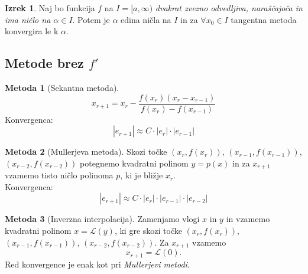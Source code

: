 \documentclass[11pt]{article}
\theoremstyle{definition}
\newtheorem{izrek}{Izrek}
\newtheorem*{metoda}{Metoda}
\begin{document}
\begin{izrek}

Naj bo funkcija $f$ na $I = [a, \infty)$ \textit{dvakrat zvezno odvedljiva, naraščajoča in ima ničlo na $\alpha \in I$}. Potem je $\alpha$ edina ničla na $I$ in za $\forall x_0 \in I$ tangentna metoda konvergira le k $\alpha$.

\end{izrek}
\vspace{0.5cm}


\subsection{Metode brez $f'$}
\vspace{0.5cm}


\begin{metoda}[Sekantna metoda]

$$x_{r+1} = x_r - \frac{f(x_r)(x_r - x_{r-1})}{f(x_r) - f(x_{r-1})}$$
Konvergenca:
$$|e_{r+1}| \approx C \cdot |e_r| \cdot |e_{r-1}|$$

\end{metoda}
\vspace{0.5cm}

\begin{metoda}[Mullerjeva metoda]

Skozi točke $(x_r, f(x_r))$, $(x_{r-1}, f(x_{r-1}))$, \\$(x_{r-2}, f(x_{r-2}))$ potegnemo kvadratni polinom $y = p(x)$ in za $x_{r+1}$ vzamemo tisto ničlo polinoma $p$, ki je bližje $x_r$. \\

\noindent Konvergenca:
$$|e_{r+1}| \approx C \cdot |e_r| \cdot |e_{r-1}| \cdot |e_{r-2}|$$

\end{metoda}
\vspace{0.5cm}

\begin{metoda}[Inverzna interpolacija]

Zamenjamo vlogi $x$ in $y$ in vzamemo kvadratni polinom $x = \mathcal{L}(y)$, ki gre skozi točke $(x_r, f(x_r))$, $(x_{r-1}, f(x_{r-1}))$, $(x_{r-2}, f(x_{r-2}))$. Za $x_{r+1}$ vzamemo
$$x_{r+1} = \mathcal{L}(0).$$
Red konvergence je enak kot pri \textit{Mullerjevi metodi}.

\end{metoda}
\vspace{0.5cm}
\end{document}
